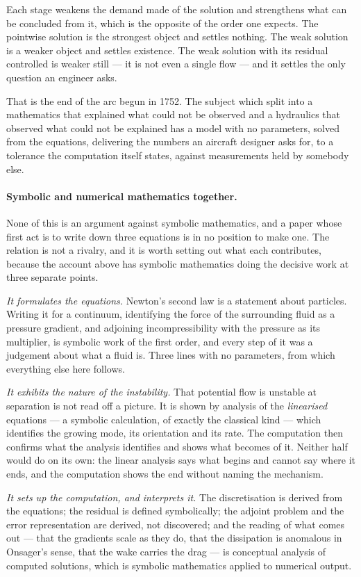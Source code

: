 \documentclass[11pt]{article}
\begin{document}
\noindent Each stage weakens the demand made of the solution and strengthens what can be concluded
from it, which is the opposite of the order one expects. The pointwise solution is the strongest
object and settles nothing. The weak solution is a weaker object and settles existence. The weak
solution with its residual controlled is weaker still --- it is not even a single flow --- and it
settles the only question an engineer asks.

That is the end of the arc begun in 1752. The subject which split into a mathematics that explained
what could not be observed and a hydraulics that observed what could not be explained has a model
with no parameters, solved from the equations, delivering the numbers an aircraft designer asks for,
to a tolerance the computation itself states, against measurements held by somebody else.

\paragraph{Symbolic and numerical mathematics together.} None of this is an argument against symbolic
mathematics, and a paper whose first act is to write down three equations is in no position to make
one. The relation is not a rivalry, and it is worth setting out what each contributes, because the
account above has symbolic mathematics doing the decisive work at three separate points.

\emph{It formulates the equations.} Newton's second law is a statement about particles. Writing it
for a continuum, identifying the force of the surrounding fluid as a pressure gradient, and adjoining
incompressibility with the pressure as its multiplier, is symbolic work of the first order, and every
step of it was a judgement about what a fluid is. Three lines with no parameters, from which
everything else here follows.

\emph{It exhibits the nature of the instability.} That potential flow is unstable at separation is
not read off a picture. It is shown by analysis of the \emph{linearised} equations --- a symbolic
calculation, of exactly the classical kind --- which identifies the growing mode, its orientation and
its rate. The computation then confirms what the analysis identifies and shows what becomes of it.
Neither half would do on its own: the linear analysis says what begins and cannot say where it ends,
and the computation shows the end without naming the mechanism.

\emph{It sets up the computation, and interprets it.} The discretisation is derived from the
equations; the residual is defined symbolically; the adjoint problem and the error representation are
derived, not discovered; and the reading of what comes out --- that the gradients scale as they do,
that the dissipation is anomalous in Onsager's sense, that the wake carries the drag --- is
conceptual analysis of computed solutions, which is symbolic mathematics applied to numerical output.
\end{document}

